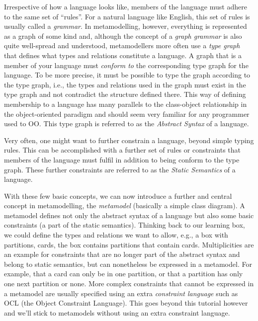 Irrespective of how a language looks like, members of the language must adhere to the same set of ``rules''.
For a natural language like English, this set of rules is usually called a \emph{grammar}.
In metamodelling, however, everything is represented as a graph of some kind and, although the concept of a  \emph{graph grammar} is also quite well-spread and understood, metamodellers  more often use a \emph{type graph} that defines what types and relations  constitute a language.
A graph that is a member of your language must \emph{conform to} the corresponding type graph for the language.
To be more precise, it must be possible to type the graph according to the type graph, i.e., the types and relations used in the graph must exist in the type graph and not contradict the structure defined there.
This way of defining membership to a language has many parallels to the class-object relationship in the object-oriented paradigm and should seem very familiar for any programmer used to OO.
This type graph is referred to as the \emph{Abstract Syntax} of a language.

Very often, one might want to further constrain a language, beyond simple typing rules.
This can be accomplished with a further set of rules or constraints that members of the language must fulfil in addition to being conform to the type graph.
These further constraints are referred to as the \emph{Static Semantics} of a language.

With these few basic concepts, we can now introduce a further and central concept in metamodelling, the \emph{metamodel} (basically a simple class diagram).
A metamodel defines not only the abstract syntax of a language but also some basic constraints (a part of the static semantics).
Thinking back to our learning box, we could define the types and relations we want to allow, e.g.,  a box with partitions, cards, the box contains partitions that contain cards.
Multiplicities are an example for constraints that are no longer part of the abstract syntax and belong to static semantics, but can nonetheless be expressed in a metamodel.
For example, that a card can only be in one partition, or that a partition has only one next partition or none.
More complex constraints that cannot be expressed in a metamodel are usually specified using an extra \emph{constraint language} such as OCL (the Object Constraint Language).
This goes beyond this tutorial however and we'll stick to metamodels without using an extra constraint language.

